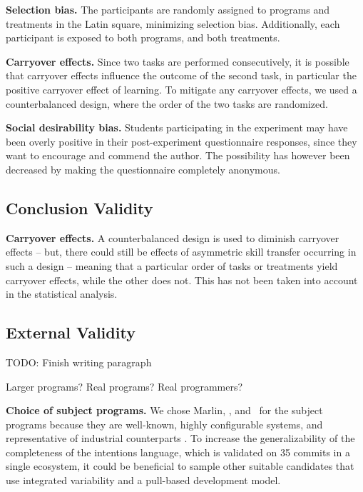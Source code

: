 \textbf{Selection bias.} The participants are randomly assigned to programs and treatments in the Latin square, minimizing selection bias. Additionally, each participant is exposed to both programs, and both treatments.

\textbf{Carryover effects.} Since two tasks are performed consecutively, it is possible that carryover effects influence the outcome of the second task, in particular the positive carryover effect of learning. To mitigate any carryover effects, we used a counterbalanced design, where the order of the two tasks are randomized.

\textbf{Social desirability bias.} Students participating in the experiment may have been overly positive in their post-experiment questionnaire responses, since they want to encourage and commend the author. The possibility has however been decreased by making the questionnaire completely anonymous.


\subsection{Conclusion Validity}

\textbf{Carryover effects.} A counterbalanced design is used to diminish carryover effects -- but, there could still be effects of asymmetric skill transfer occurring in such a design -- meaning that a particular order of tasks or treatments yield carryover effects, while the other does not. This has not been taken into account in the statistical analysis.

\subsection{External Validity}
TODO: Finish writing paragraph

Larger programs?
Real programs?
Real programmers?

\textbf{Choice of subject programs.} We chose Marlin, \busybox, and \vim~for the subject programs because they are well-known, highly configurable systems, and representative of industrial counterparts \cite{hunsen2016}. To increase the generalizability of the completeness of the intentions language, which is validated on 35 commits in a single ecosystem, it could be beneficial to sample other suitable candidates that use integrated variability and a pull-based development model.
